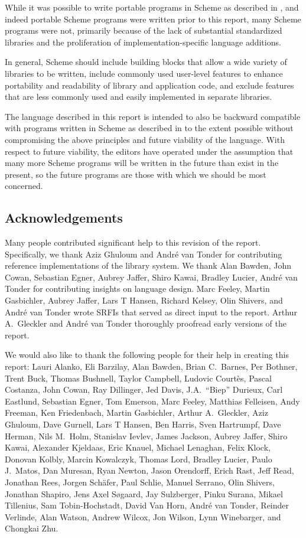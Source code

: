 While it was possible to write portable programs in Scheme as
described in , and indeed portable Scheme programs were written
prior to this report, many Scheme programs were not, primarily because
of the lack of substantial standardized libraries and the
proliferation of implementation-specific language additions.

In general, Scheme should include building blocks that allow a wide
variety of libraries to be written, include commonly used user-level
features to enhance portability and readability of library and
application code, and exclude features that are less commonly used and
easily implemented in separate libraries.

The language described in this report is intended to also be backward
compatible with programs written in Scheme as described in  to
the extent possible without compromising the above principles and
future viability of the language.  With respect to future viability,
the editors have operated under the assumption that many more Scheme
programs will be written in the future than exist in the present, so
the future programs are those with which we should be most concerned.

\subsection*{Acknowledgements}

Many people contributed significant help to this revision of the
report.  Specifically, we thank Aziz Ghuloum and Andr\'e van Tonder for
contributing reference implementations of the library system.  We
thank Alan Bawden, John Cowan, Sebastian Egner, Aubrey Jaffer, Shiro
Kawai, Bradley Lucier, Andr\'e van Tonder for contributing insights on
language design.  Marc Feeley, Martin Gasbichler, Aubrey Jaffer, Lars T Hansen,
Richard Kelsey, Olin Shivers, and Andr\'e van Tonder wrote SRFIs that
served as direct input to the report.  Arthur A.\ Gleckler and Andr\'e
van Tonder thoroughly proofread early versions of the report.

We would also like to thank the following people for their
help in creating this report: Lauri Alanko,
Eli Barzilay, Alan Bawden, Brian C.\ Barnes, Per Bothner, Trent Buck,
Thomas Bushnell, Taylor Campbell, Ludovic Court\`es, Pascal Costanza,
John Cowan, Ray Dillinger, Jed Davis, J.A.\ ``Biep'' Durieux, Carl Eastlund,
Sebastian Egner, Tom Emerson, Marc Feeley, Matthias Felleisen, Andy
Freeman, Ken Friedenbach, Martin Gasbichler, Arthur A.\ Gleckler, Aziz
Ghuloum, Dave Gurnell, Lars T Hansen, Ben Harris, Sven Hartrumpf, Dave
Herman, Nils M.\ Holm, Stanislav Ievlev, James Jackson, Aubrey Jaffer,
Shiro Kawai, Alexander Kjeldaas, Eric Knauel, Michael Lenaghan, Felix Klock,
Donovan Kolbly, Marcin Kowalczyk, Thomas Lord, Bradley Lucier, Paulo
J.\ Matos, Dan Muresan, Ryan Newton, Jason Orendorff, Erich Rast, Jeff
Read, Jonathan Rees, Jorgen Sch\"afer, Paul Schlie, Manuel Serrano,
Olin Shivers, Jonathan Shapiro, Jens Axel S\o{}gaard, Jay Sulzberger,
Pinku Surana, Mikael Tillenius, Sam Tobin-Hochstadt, David Van Horn,
Andr\'e van Tonder, Reinder Verlinde, Alan Watson, Andrew Wilcox, Jon
Wilson, Lynn Winebarger, and Chongkai Zhu.

